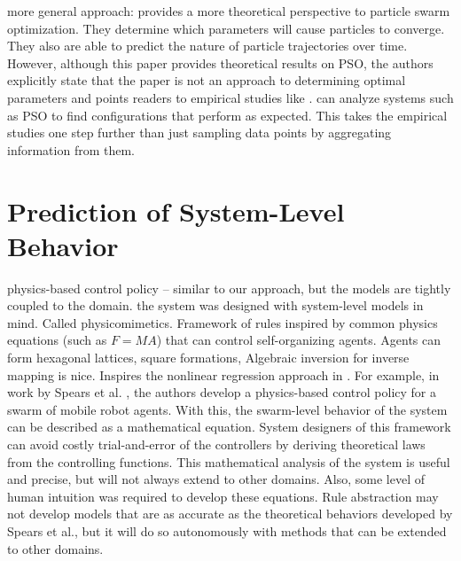 more general approach: \cite{van2006study}
provides a more theoretical perspective to particle swarm optimization.
They determine which parameters will cause particles to converge.
They also are able to predict the nature of particle trajectories over time.
However, although this paper provides theoretical results on PSO, the authors explicitly state that the paper is not an approach to determining optimal parameters and points readers to empirical studies like \cite{shi1998parameter}.
\fw can analyze systems such as PSO to find configurations that perform as expected.
This takes the empirical studies one step further than just sampling data points by aggregating information from them.

\section{Prediction of System-Level Behavior}

physics-based control policy \cite{spears2004dpb} -- similar to our approach, but the models are tightly coupled to the domain. the system was designed with system-level models in mind.
Called physicomimetics.
Framework of rules inspired by common physics equations (such as $F=MA$) that can control self-organizing agents.
Agents can form hexagonal lattices, square formations,
Algebraic inversion for inverse mapping is nice. Inspires the nonlinear regression approach in \fw.
For example, in work by Spears et al. \cite{spears2004dpb}, the authors develop a physics-based control policy for
a swarm of mobile robot agents. With this, the swarm-level behavior of the system can be described as a mathematical equation.
System designers of this framework can avoid costly trial-and-error of the controllers by deriving theoretical laws from the controlling functions.
This mathematical analysis of the system is useful and precise, but will
not always extend to other domains. Also, some level of human intuition was required to develop these equations.
Rule abstraction may not develop models that are as accurate as the theoretical behaviors developed by Spears et al., but it will do so
autonomously with methods that can be extended to other domains.

